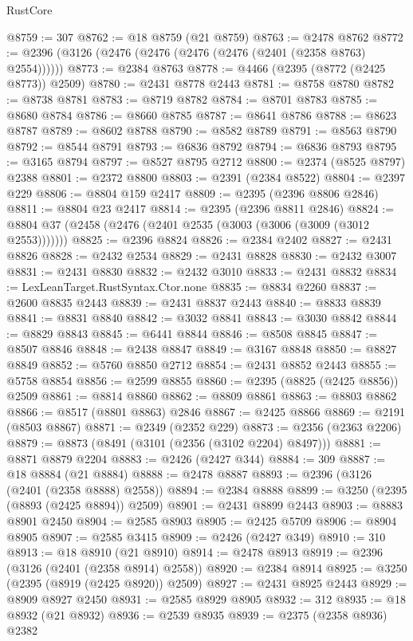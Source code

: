 \begin{lexlean}{RustCore}
\begin{coremodule}
@8759 := 307
@8762 := @18 @8759 (@21 @8759)
@8763 := @2478 @8762
@8772 := @2396 (@3126 (@2476 (@2476 (@2476 (@2476 (@2401 (@2358 @8763) @2554))))))
@8773 := @2384 @8763
@8778 := @4466 (@2395 (@8772 (@2425 @8773)) @2509)
@8780 := @2431 @8778 @2443
@8781 := @8758 @8780
@8782 := @8738 @8781
@8783 := @8719 @8782
@8784 := @8701 @8783
@8785 := @8680 @8784
@8786 := @8660 @8785
@8787 := @8641 @8786
@8788 := @8623 @8787
@8789 := @8602 @8788
@8790 := @8582 @8789
@8791 := @8563 @8790
@8792 := @8544 @8791
@8793 := @6836 @8792
@8794 := @6836 @8793
@8795 := @3165 @8794
@8797 := @8527 @8795 @2712
@8800 := @2374 (@8525 @8797) @2388
@8801 := @2372 @8800
@8803 := @2391 (@2384 @8522)
@8804 := @2397 @229
@8806 := @8804 @159 @2417
@8809 := @2395 (@2396 @8806 @2846)
@8811 := @8804 @23 @2417
@8814 := @2395 (@2396 @8811 @2846)
@8824 := @8804 @37 (@2458 (@2476 (@2401 @2535 (@3003 (@3006 (@3009 (@3012 @2553)))))))
@8825 := @2396 @8824
@8826 := @2384 @2402
@8827 := @2431 @8826
@8828 := @2432 @2534
@8829 := @2431 @8828
@8830 := @2432 @3007
@8831 := @2431 @8830
@8832 := @2432 @3010
@8833 := @2431 @8832
@8834 := LexLeanTarget.RustSyntax.Ctor.none
@8835 := @8834 @2260
@8837 := @2600 @8835 @2443
@8839 := @2431 @8837 @2443
@8840 := @8833 @8839
@8841 := @8831 @8840
@8842 := @3032 @8841
@8843 := @3030 @8842
@8844 := @8829 @8843
@8845 := @6441 @8844
@8846 := @8508 @8845
@8847 := @8507 @8846
@8848 := @2438 @8847
@8849 := @3167 @8848
@8850 := @8827 @8849
@8852 := @5760 @8850 @2712
@8854 := @2431 @8852 @2443
@8855 := @5758 @8854
@8856 := @2599 @8855
@8860 := @2395 (@8825 (@2425 @8856)) @2509
@8861 := @8814 @8860
@8862 := @8809 @8861
@8863 := @8803 @8862
@8866 := @8517 (@8801 @8863) @2846
@8867 := @2425 @8866
@8869 := @2191 (@8503 @8867)
@8871 := @2349 (@2352 @229)
@8873 := @2356 (@2363 @2206)
@8879 := @8873 (@8491 (@3101 (@2356 (@3102 @2204) @8497)))
@8881 := @8871 @8879 @2204
@8883 := @2426 (@2427 @344)
@8884 := 309
@8887 := @18 @8884 (@21 @8884)
@8888 := @2478 @8887
@8893 := @2396 (@3126 (@2401 (@2358 @8888) @2558))
@8894 := @2384 @8888
@8899 := @3250 (@2395 (@8893 (@2425 @8894)) @2509)
@8901 := @2431 @8899 @2443
@8903 := @8883 @8901 @2450
@8904 := @2585 @8903
@8905 := @2425 @5709
@8906 := @8904 @8905
@8907 := @2585 @3415
@8909 := @2426 (@2427 @349)
@8910 := 310
@8913 := @18 @8910 (@21 @8910)
@8914 := @2478 @8913
@8919 := @2396 (@3126 (@2401 (@2358 @8914) @2558))
@8920 := @2384 @8914
@8925 := @3250 (@2395 (@8919 (@2425 @8920)) @2509)
@8927 := @2431 @8925 @2443
@8929 := @8909 @8927 @2450
@8931 := @2585 @8929 @8905
@8932 := 312
@8935 := @18 @8932 (@21 @8932)
@8936 := @2539 @8935
@8939 := @2375 (@2358 @8936) @2382

\end{coremodule}
\end{lexlean}

